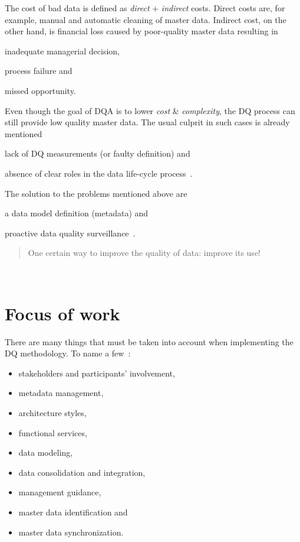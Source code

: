 The cost of bad data is defined as \textit{direct} + \textit{indirect} costs.
Direct costs are, for example, manual and automatic cleaning of master data.
Indirect cost, on the other hand, is financial loss caused by poor-quality master data resulting in
\begin{enumerate*}[label=(\roman*)]
    \item inadequate managerial decision,
    \item process failure and
    \item missed opportunity.
\end{enumerate*}

Even though the goal of DQA is to lower \textit{cost} \& \textit{complexity}, the DQ process can still provide low quality master data.
The usual culprit in such cases is already mentioned
\begin{enumerate*}[label=(\roman*)]
    \item lack of DQ measurements (or faulty definition) and
    \item absence of clear roles in the data life-cycle process~\cite{haug2013}.
\end{enumerate*}

The solution to the problems mentioned above are
\begin{enumerate*}[label=(\roman*)]
    \item a data model definition (metadata) and
    \item proactive data quality surveillance~\cite{risto2011}.
\end{enumerate*}

\blockquote[][]{One certain way to improve the quality of data: improve its use!}~\cite{orr1998}

\section*{Focus of work}

There are many things that must be taken into account when implementing the DQ methodology.
To name a few~\cite{loshin2008}:

\begin{itemize}
    \item stakeholders and participants' involvement,
    \item metadata management,
    \item architecture styles,
    \item functional services,
    \item data modeling,
    \item data consolidation and integration,
    \item management guidance,
    \item master data identification and
    \item master data synchronization.
\end{itemize}

